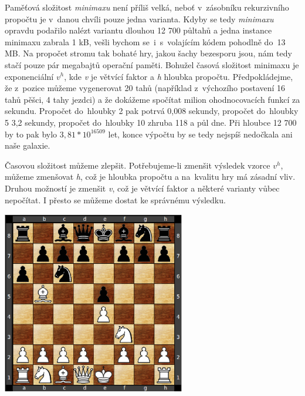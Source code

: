 \documentclass[11pt, titlepage]{article}
\begin{document}
Paměťová složitost {\it minimaxu} není příliš velká, neboť v~zásobníku rekurzivního propočtu je v~danou chvíli pouze jedna varianta. Kdyby se tedy {\it minimaxu} opravdu podařilo nalézt variantu dlouhou 12 700 půltahů a jedna instance minimaxu zabrala 1 kB, vešli bychom se~i~s~volajícím kódem pohodlně do~13 MB. Na propočet stromu tak bohaté hry, jakou šachy bezesporu jsou, nám tedy stačí pouze pár megabajtů operační paměti. Bohužel časová složitost minimaxu je exponenciální \begin{math}v^h\end{math}, kde {\it v} je větvící faktor a {\it h} hloubka propočtu. Předpokládejme, že z~pozice můžeme vygenerovat 20 tahů (například z~výchozího postavení 16 tahů pěšci, 4 tahy jezdci) a že dokážeme spočítat milion ohodnocovacích funkcí za sekundu. Propočet do~hloubky 2 pak potrvá 0,008 sekundy, propočet do~hloubky 5 3,2 sekundy, propočet do~hloubky 10 zhruba 118 a půl dne. Při hloubce 12 700 by to pak bylo \begin{math}3,81 * 10^{16509}\end{math} let, konce výpočtu by se tedy nejspíš nedočkala ani naše galaxie.

Časovou složitost můžeme zlepšit. Potřebujeme-li zmenšit výsledek vzorce \begin{math}v^h\end{math}, můžeme zmenšovat {\it h}, což je hloubka propočtu a na~kvalitu hry má zásadní vliv. Druhou možností je zmenšit {\it v}, což je větvící faktor a některé varianty vůbec nepočítat. I přesto se můžeme dostat ke správnému výsledku.

\begin{center}
	\includegraphics[width=8cm, height=8cm]{diagram1.ps}
\end{center}
\end{document}
